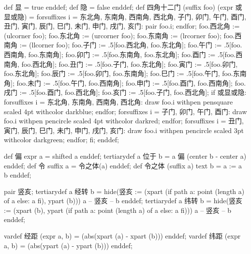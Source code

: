 \startMPinclusions[+]
def 显 = true enddef;
def 隐 = false enddef;
def 四角十二门 (suffix foo) (expr 或显或隐) = 
  forsuffixes i = 东北角, 东南角, 西南角, 西北角,
                  子门, 卯门, 午门, 酉门,
                  丑门, 寅门, 辰门, 巳门, 未门, 申门, 戌门, 亥门:
    pair foo.i;
  endfor;
  foo.西北角 := (ulcorner foo); 
  foo.东北角 := (urcorner foo);
  foo.东南角 := (lrcorner foo);
  foo.西南角 := (llcorner foo);
  foo.子门 := .5[foo.西北角, foo.东北角];
  foo.午门 := .5[foo.西南角, foo.东南角];
  foo.卯门 := .5[foo.东南角, foo.东北角];
  foo.酉门 := .5[foo.西南角, foo.西北角];
  foo.丑门 := .5[foo.子门, foo.东北角];
  foo.寅门 := .5[foo.卯门, foo.东北角];
  foo.辰门 := .5[foo.卯门, foo.东南角];
  foo.巳门 := .5[foo.午门, foo.东南角];
  foo.未门 := .5[foo.午门, foo.西南角];
  foo.申门 := .5[foo.酉门, foo.西南角];
  foo.戌门 := .5[foo.酉门, foo.西北角];
  foo.亥门 := .5[foo.子门, foo.西北角];
  if 或显或隐:
    forsuffixes i = 东北角, 东南角, 西南角, 西北角:
      draw foo.i withpen pensquare scaled 4pt withcolor darkblue;
    endfor;
    forsuffixes i = 子门, 卯门, 午门, 酉门:
      draw foo.i withpen pencircle scaled 4pt withcolor darkred;
    endfor;
    forsuffixes i = 丑门, 寅门, 辰门, 巳门, 未门, 申门, 戌门, 亥门:
      draw foo.i
        withpen pencircle scaled 3pt withcolor darkgreen;
    endfor;
  fi;
enddef;
\stopMPinclusions

\startMPinclusions[+]
def 偏 expr a = shifted a enddef;
tertiarydef a 位于 b = a 偏 (center b - center a) enddef;
def 令 suffix a = 令之体(a) enddef;
def 令之体 (suffix a) text b = a := a b enddef;
\stopMPinclusions

\startMPinclusions[+]
pair 竖亥;
tertiarydef a 经转 b =
  hide(竖亥 := (xpart (if path a: point (length a) of a else: a fi), ypart (b)))
  a -- 竖亥 -- b
enddef;
tertiarydef a 纬转 b =
  hide(竖亥 := (xpart (b), ypart (if path a: point (length a) of a else: a fi)))
  a --  竖亥 -- b
enddef;
\stopMPinclusions

\startMPinclusions[+]
vardef 经距 (expr a, b) = (abs(xpart (a) - xpart (b))) enddef;
vardef 纬距 (expr a, b) = (abs(ypart (a) - ypart (b))) enddef;
\stopMPinclusions


